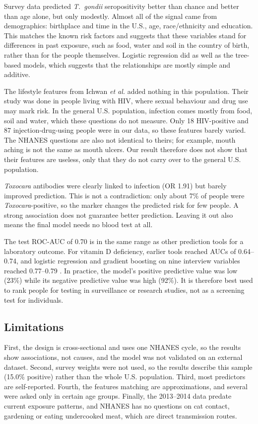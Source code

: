 \documentclass[conference]{IEEEtran}
\begin{document}
Survey data predicted \textit{T.~gondii} seropositivity better than chance and better than age alone, but only modestly. Almost all of the signal came from demographics: birthplace and time in the U.S., age, race/ethnicity and education. This matches the known risk factors \cite{jones2014} and suggests that these variables stand for differences in past exposure, such as food, water and soil in the country of birth, rather than for the people themselves. Logistic regression did as well as the tree-based models, which suggests that the relationships are mostly simple and additive.

The lifestyle features from Ichwan \textit{et al.} \cite{ichwan} added nothing in this population. Their study was done in people living with HIV, where sexual behaviour and drug use may mark risk. In the general U.S. population, infection comes mostly from food, soil and water, which these questions do not measure. Only 18 HIV-positive and 87 injection-drug-using people were in our data, so these features barely varied. The NHANES questions are also not identical to theirs; for example, mouth aching is not the same as mouth ulcers. Our result therefore does not show that their features are useless, only that they do not carry over to the general U.S. population.

\textit{Toxocara} antibodies were clearly linked to infection (OR 1.91) but barely improved prediction. This is not a contradiction: only about 7\% of people were \textit{Toxocara}-positive, so the marker changes the predicted risk for few people. A strong association does not guarantee better prediction. Leaving it out also means the final model needs no blood test at all.

The test ROC-AUC of 0.70 is in the same range as other prediction tools for a laboratory outcome. For vitamin D deficiency, earlier tools reached AUCs of 0.64--0.74, and logistic regression and gradient boosting on nine interview variables reached 0.77--0.79 \cite{guo2024}. In practice, the model's positive predictive value was low (23\%) while its negative predictive value was high (92\%). It is therefore best used to rank people for testing in surveillance or research studies, not as a screening test for individuals.

\subsection{Limitations}
First, the design is cross-sectional and uses one NHANES cycle, so the results show associations, not causes, and the model was not validated on an external dataset. Second, survey weights were not used, so the results describe this sample (15.0\% positive) rather than the whole U.S. population. Third, most predictors are self-reported. Fourth, the features matching \cite{ichwan} are approximations, and several were asked only in certain age groups. Finally, the 2013--2014 data predate current exposure patterns, and NHANES has no questions on cat contact, gardening or eating undercooked meat, which are direct transmission routes.
\end{document}
